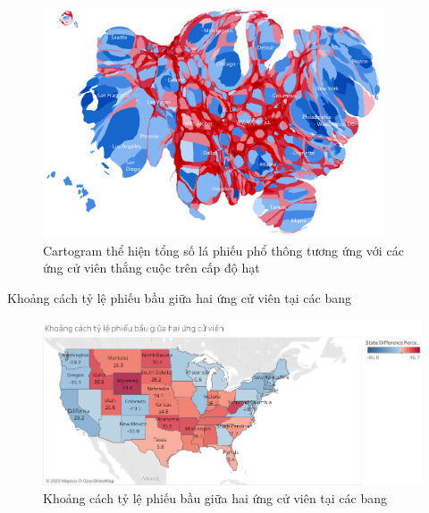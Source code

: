 \documentclass[10pt]{beamer}
\theoremstyle{remark}
\theoremstyle{definition}
\begin{document}
\begin{frame}
	\begin{figure}[h!]
        \centering
        \includegraphics[width=0.9\textwidth]{figures/County_Total_Vote_Cartogram.png}
        \caption{Cartogram thể hiện tổng số lá phiếu phổ thông tương ứng với các ứng cử viên thắng cuộc trên cấp độ hạt}
    \end{figure}
\end{frame}

\begin{frame}{Khoảng cách tỷ lệ phiếu bầu giữa hai ứng cử viên tại các bang}
	\begin{figure}[h!]
        \centering
        \includegraphics[width=\textwidth]{figures/State_Difference_Percentage_Total_Vote_Two_Candidate.png}
        \caption{Khoảng cách tỷ lệ phiếu bầu giữa hai ứng cử viên tại các bang}
    \end{figure}
\end{frame}
\end{document}
